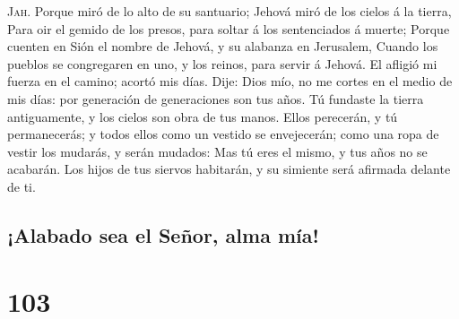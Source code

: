 \textsc{Jah}.  Porque miró de lo alto de su santuario;
Jehová miró de los cielos á la tierra,  Para oir el
gemido de los presos, para soltar á los sentenciados á muerte;
 Porque cuenten en Sión el nombre de Jehová, y su
alabanza en Jerusalem,  Cuando los pueblos se congregaren
en uno, y los reinos, para servir á Jehová.  El afligió
mi fuerza en el camino; acortó mis días.  Dije: Dios mío,
no me cortes en el medio de mis días: por generación de generaciones son
tus años.  Tú fundaste la tierra antiguamente, y los
cielos son obra de tus manos.  Ellos perecerán, y tú
permanecerás; y todos ellos como un vestido se envejecerán; como una
ropa de vestir los mudarás, y serán mudados:  Mas tú eres
el mismo, y tus años no se acabarán.  Los hijos de tus
siervos habitarán, y su simiente será afirmada delante de ti.

\hypertarget{alabado-sea-el-seuxf1or-alma-muxeda}{%
\subsection{¡Alabado sea el Señor, alma
mía!}\label{alabado-sea-el-seuxf1or-alma-muxeda}}

\hypertarget{section-102}{%
\section{103}\label{section-102}}

